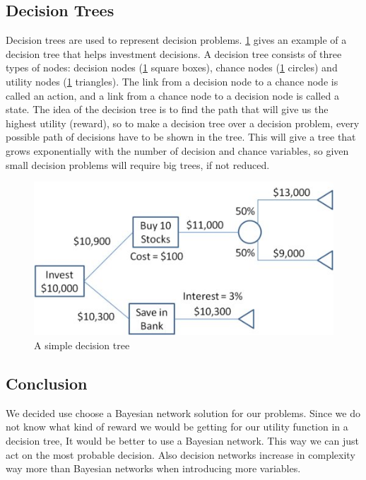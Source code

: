 \subsection{Decision Trees}
Decision trees are used to represent decision problems. \ref{fig:basicdecisiontree} gives an example of a decision tree that helps investment decisions. A decision tree consists of three types of nodes: decision nodes (\ref{fig:basicdecisiontree} square boxes), chance nodes (\ref{fig:basicdecisiontree} circles) and utility nodes (\ref{fig:basicdecisiontree} triangles). The link from a decision node to a chance node is called an action, and a link from a chance node to a decision node is called a state. The idea of the decision tree is to find the path that will give us the highest utility (reward), so to make a decision tree over a decision problem, every possible path of decisions have to be shown in the tree. This will give a tree that grows exponentially with the number of decision and chance variables, so given small decision problems will require big trees, if not reduced. 
	
\begin{figure}[H]
\includegraphics[scale=.8]{Figures/BayesianPictures/SimpleDecisionTree.png}
\caption{A simple decision tree \cite{sdt}}
\label{fig:basicdecisiontree}
\end{figure}

\subsection{Conclusion}
We decided use choose a Bayesian network solution for our problems. Since we do not know what kind of reward we would be getting for our utility function in a decision tree, It would be better to use a Bayesian network. This way we can just act on the most probable decision. Also decision networks increase in complexity way more than Bayesian networks when introducing more variables.
